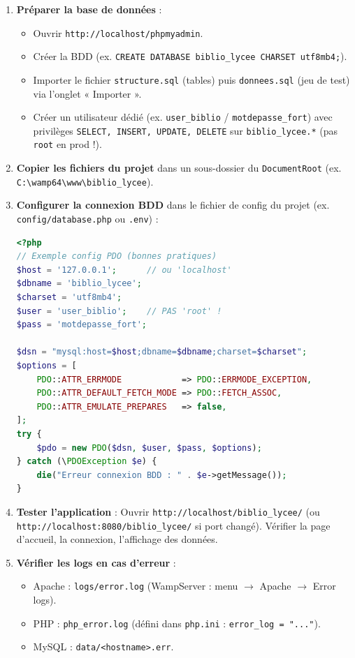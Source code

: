 \documentclass[11pt]{article}
\begin{document}
\begin{methode}
\begin{enumerate}
\item \textbf{Préparer la base de données} :
      \begin{itemize}
      \item Ouvrir \texttt{http://localhost/phpmyadmin}.
      \item Créer la BDD (ex. \texttt{CREATE DATABASE biblio\_lycee CHARSET utf8mb4;}).
      \item Importer le fichier \texttt{structure.sql} (tables) puis \texttt{donnees.sql} (jeu de test) via l'onglet « Importer ».
      \item Créer un utilisateur dédié (ex. \texttt{user\_biblio} / \texttt{motdepasse\_fort}) avec privilèges \texttt{SELECT, INSERT, UPDATE, DELETE} sur \texttt{biblio\_lycee.*} (pas \texttt{root} en prod !).
      \end{itemize}
\item \textbf{Copier les fichiers du projet} dans un sous-dossier du \texttt{DocumentRoot} (ex. \texttt{C:\textbackslash wamp64\textbackslash www\textbackslash biblio\_lycee}).
\item \textbf{Configurer la connexion BDD} dans le fichier de config du projet (ex. \texttt{config/database.php} ou \texttt{.env}) :
\begin{lstlisting}[language=php]
<?php
// Exemple config PDO (bonnes pratiques)
$host = '127.0.0.1';      // ou 'localhost'
$dbname = 'biblio_lycee';
$charset = 'utf8mb4';
$user = 'user_biblio';    // PAS 'root' !
$pass = 'motdepasse_fort';

$dsn = "mysql:host=$host;dbname=$dbname;charset=$charset";
$options = [
    PDO::ATTR_ERRMODE            => PDO::ERRMODE_EXCEPTION,
    PDO::ATTR_DEFAULT_FETCH_MODE => PDO::FETCH_ASSOC,
    PDO::ATTR_EMULATE_PREPARES   => false,
];
try {
    $pdo = new PDO($dsn, $user, $pass, $options);
} catch (\PDOException $e) {
    die("Erreur connexion BDD : " . $e->getMessage());
}
\end{lstlisting}
\item \textbf{Tester l'application} : Ouvrir \texttt{http://localhost/biblio\_lycee/} (ou \texttt{http://localhost:8080/biblio\_lycee/} si port changé). Vérifier la page d'accueil, la connexion, l'affichage des données.
\item \textbf{Vérifier les logs en cas d'erreur} :
      \begin{itemize}
      \item Apache : \texttt{logs/error.log} (WampServer : menu $\rightarrow$ Apache $\rightarrow$ Error logs).
      \item PHP : \texttt{php\_error.log} (défini dans \texttt{php.ini} : \texttt{error\_log = "..."}).
      \item MySQL : \texttt{data/\textless hostname\textgreater.err}.
      \end{itemize}
\end{enumerate}
\end{methode}
\end{document}
